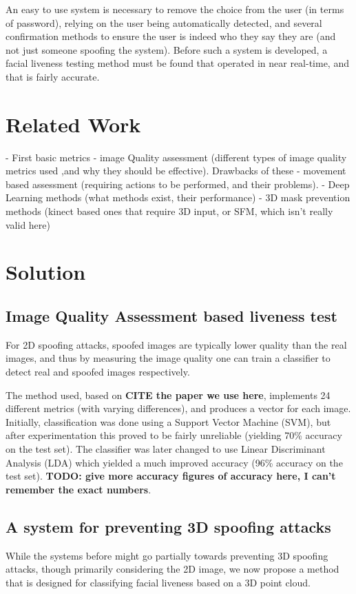 \documentclass[10pt,a4paper]{article}
\begin{document}
    An easy to use system is necessary to remove the choice from the user (in terms of password), relying on the user being automatically
    detected, and several confirmation methods to ensure the user is indeed who they say they are (and not just someone spoofing the system).
    Before such a system is developed, a facial liveness testing method must be found that operated in near real-time, and that is fairly accurate.


\section{Related Work}
    - First basic metrics
    - image Quality assessment (different types of image quality metrics used ,and why they should be effective). Drawbacks of these
    - movement based assessment (requiring actions to be performed, and their problems).
    - Deep Learning methods (what methods exist, their performance)
    - 3D mask prevention methods (kinect based ones that require 3D input, or SFM, which isn't really valid here)
\section{Solution}
    \subsection{Image Quality Assessment based liveness test}
        For 2D spoofing attacks, spoofed images are typically lower quality than the real images, and thus by measuring the image quality
        one can train a classifier to detect real and spoofed images respectively.

        The method used, based on \textbf{CITE the paper we use here}, implements 24 different metrics (with varying differences), and produces
        a vector for each image. Initially, classification was done using a Support Vector Machine (SVM), but after experimentation this proved to be fairly
        unreliable (yielding 70\% accuracy on the test set). The classifier was later changed to use Linear Discriminant Analysis (LDA) which yielded a much improved
        accuracy (96\% accuracy on the test set). \textbf{TODO: give more accuracy figures of accuracy here, I can't remember the exact numbers}.

    \subsection{A system for preventing 3D spoofing attacks}
        While the systems before might go partially towards preventing 3D spoofing attacks, though primarily considering the 2D image, we now propose a method
        that is designed for classifying facial liveness based on a 3D point cloud.
\end{document}

